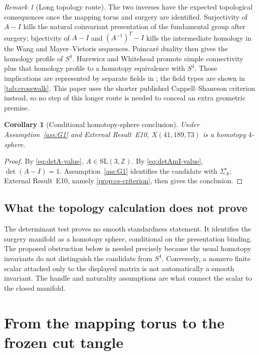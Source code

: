 \documentclass[10pt,reqno]{amsart}
\newtheorem{corollary}[theorem]{Corollary}
\theoremstyle{definition}
\theoremstyle{remark}
\newtheorem{remark}[theorem]{Remark}
\newcommand{\Z}{\mathbb Z}
\begin{document}
\begin{remark}[Long topology route]\label{rem:long-topology-route}
The two inverses have the expected topological consequences once the mapping
torus and surgery are identified.  Surjectivity of $A-I$ kills the natural
coinvariant presentation of the fundamental group after surgery; bijectivity
of $A-I$ and $(A^{-1})^T-I$ kills the intermediate homology in the Wang and
Mayer--Vietoris sequences.  Poincar\'e duality then gives the homology profile
of $S^4$.  Hurewicz and Whitehead promote simple connectivity plus that
homology profile to a homotopy equivalence with $S^4$.  Those implications are
represented by separate fields in ; the field types
are shown in \cref{tab:crosswalk}.  This paper uses the shorter published
Cappell--Shaneson criterion instead, so no step of this longer route is needed
to conceal an extra geometric premise.
\end{remark}

\begin{corollary}[Conditional homotopy-sphere conclusion]\label{cor:homotopy-sphere}
Under Assumption~\ref{ass:G1} and External Result~E10,
$X(41,189,73)$ is a homotopy $4$-sphere.
\end{corollary}

\begin{proof}
By \cref{eq:detA-value}, $A\in\mathrm{SL}(3,\Z)$.  By
\cref{eq:detAmI-value}, $\det(A-I)=1$.  Assumption~\ref{ass:G1}
identifies the candidate with $\Sigma_A^\epsilon$; External Result~E10,
namely \cref{prop:cs-criterion}, then gives the conclusion.
\end{proof}

\subsection{What the topology calculation does not prove}

The determinant test proves no smooth standardness statement.  It identifies
the surgery manifold as a homotopy sphere, conditional on the presentation
binding.  The proposed obstruction below is needed precisely because the
usual homotopy invariants do not distinguish the candidate from $S^4$.
Conversely, a nonzero finite scalar attached only to the displayed matrix is
not automatically a smooth invariant.  The handle and naturality assumptions
are what connect the scalar to the closed manifold.

\section{From the mapping torus to the frozen cut tangle}\label{sec:presentation-bridge}
\end{document}
